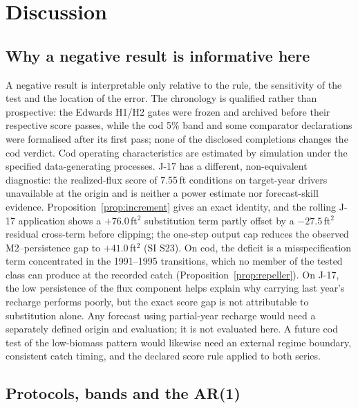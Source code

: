 \FloatBarrier
\section{Discussion}\label{sec:discussion}

\subsection{Why a negative result is informative here}\label{sec:whyinformative}

A negative result is interpretable only relative to the rule, the sensitivity of the test and the location of the error. The chronology is qualified rather than prospective: the Edwards H1/H2 gates were frozen and archived before their respective score passes, while the cod 5\% band and some comparator declarations were formalised after its first pass; none of the disclosed completions changes the cod verdict. Cod operating characteristics are estimated by simulation under the specified data-generating processes. J-17 has a different, non-equivalent diagnostic: the realized-flux score of 7.55\,ft conditions on target-year drivers unavailable at the origin and is neither a power estimate nor forecast-skill evidence. Proposition~\ref{prop:increment} gives an exact identity, and the rolling J-17 application shows a $+76.0$\,ft$^2$ substitution term partly offset by a $-27.5$\,ft$^2$ residual cross-term before clipping; the one-step output cap reduces the observed M2--persistence gap to $+41.0$\,ft$^2$ (SI S23). On cod, the deficit is a misspecification term concentrated in the 1991--1995 transitions, which no member of the tested class can produce at the recorded catch (Proposition~\ref{prop:repeller}). On J-17, the low persistence of the flux component helps explain why carrying last year's recharge performs poorly, but the exact score gap is not attributable to substitution alone. Any forecast using partial-year recharge would need a separately defined origin and evaluation; it is not evaluated here. A future cod test of the low-biomass pattern would likewise need an external regime boundary, consistent catch timing, and the declared score rule applied to both series.

\subsection{Protocols, bands and the AR(1)}\label{sec:protocoldiff}

